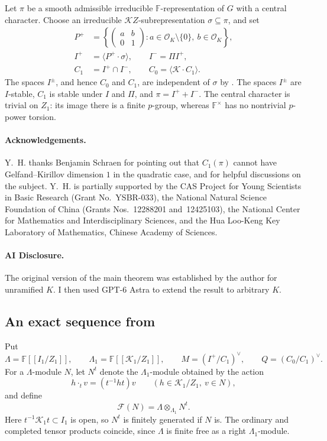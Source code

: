 \documentclass[11pt]{article}
\numberwithin{equation}{section}
\theoremstyle{definition}
\theoremstyle{remark}
\newcommand{\F}{\mathbb F}
\newcommand{\cO}{\mathcal O}
\begin{document}
\begin{cbunit}
Let $\pi$ be a smooth admissible irreducible
$\F$-representation of $G$ with a central character. Choose an
irreducible $\mathcal KZ$-subrepresentation $\sigma\subseteq\pi$,
and set
\[
 \begin{split}
 P^+&=\left\{\begin{pmatrix}a&b\\0&1\end{pmatrix}:
       a\in\cO_K\setminus\{0\},\ b\in\cO_K\right\},\\
 I^+&=\langle P^+\cdot\sigma\rangle,\qquad I^-=\Pi I^+,\\
 C_1&=I^+\cap I^-,\qquad C_0=\langle\mathcal K\cdot C_1\rangle.
 \end{split}
\]
The spaces $I^\pm$, and hence $C_0$ and $C_1$, are independent
of $\sigma$ by \cite[Cor.~3.17]{Hu12}. The spaces $I^\pm$ are $I$-stable, $C_1$ is stable
under $I$ and $\Pi$, and $\pi=I^++I^-$. The central character
is trivial on $Z_1$: its image there is a finite $p$-group,
whereas $\F^\times$ has no nontrivial $p$-power torsion.

\paragraph*{Acknowledgements.}
Y.~H. thanks Benjamin Schraen for pointing out that $C_1(\pi)$ cannot have Gelfand--Kirillov dimension $1$ in the quadratic case, and for helpful discussions on the subject.  
Y.~H. is partially supported by the CAS Project for Young Scientists in
Basic Research (Grant No.~YSBR-033), the National Natural Science Foundation
of China (Grants Nos.~12288201 and~12425103), the National Center for
Mathematics and Interdisciplinary Sciences, and the Hua Loo-Keng Key
Laboratory of Mathematics, Chinese Academy of Sciences. 

\paragraph*{AI Disclosure.}
The original version of the main theorem was established by the author for unramified $K$. I then used GPT-6 Astra to extend the result to arbitrary $K$.

\subsection{An exact sequence from \texorpdfstring{\cite{Hu12}}{Hu}}

Put
\[
 \Lambda=\F[[I_1/Z_1]],\qquad
 \Lambda_1=\F[[\mathcal K_1/Z_1]],\qquad
 M=(I^+/C_1)^\vee,\qquad Q=(C_0/C_1)^\vee.
\]
For a $\Lambda$-module $N$, let $N^t$ denote the
$\Lambda_1$-module obtained by the action
\[
 h\cdot_t v=(t^{-1}ht)v
 \qquad(h\in\mathcal K_1/Z_1,\ v\in N),
\]
and define
\[
 \mathcal F(N)=\Lambda\otimes_{\Lambda_1}N^t.
\]
Here $t^{-1}\mathcal K_1t\subset I_1$ is open, so $N^t$ is
finitely generated if $N$ is. The ordinary and completed tensor
products coincide, since $\Lambda$ is finite free as a right
$\Lambda_1$-module.


\end{cbunit}
\end{document}
